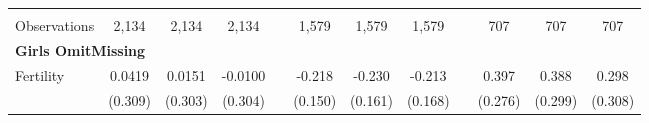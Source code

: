 \begin{landscape}
\begin{table}[htpb!]
\begin{center}
\begin{tabular}{lcccp{2mm}cccp{2mm}ccc}
\begin{footnotesize}\end{footnotesize}&\begin{footnotesize}\end{footnotesize}&\begin{footnotesize}\end{footnotesize}&\begin{footnotesize}\end{footnotesize}&\begin{footnotesize}\end{footnotesize}&\begin{footnotesize}\end{footnotesize}&\begin{footnotesize}\end{footnotesize}&\begin{footnotesize}\end{footnotesize}&\begin{footnotesize}\end{footnotesize}&\begin{footnotesize}\end{footnotesize}&\begin{footnotesize}\end{footnotesize}&\begin{footnotesize}\end{footnotesize}\\Observations&2,134&2,134&2,134&&1,579&1,579&1,579&&707&707&707\\
\multicolumn{12}{l}{\textbf{Girls OmitMissing}}\\ 
Fertility&0.0419&0.0151&-0.0100&&-0.218&-0.230&-0.213&&0.397&0.388&0.298\\
&(0.309)&(0.303)&(0.304)&&(0.150)&(0.161)&(0.168)&&(0.276)&(0.299)&(0.308)\\

\end{tabular}
\end{center}
\end{table}
\end{landscape}
